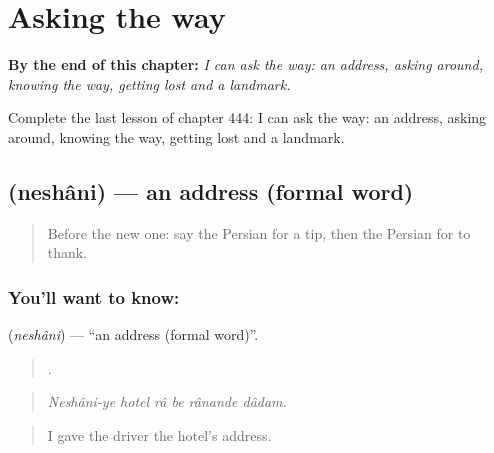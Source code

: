 
\chapter{Asking the way}
\label{ch:fa-asking-the-way}

\begin{chapteropening}
\textbf{By the end of this chapter:} \emph{I can ask the way: an address, asking around, knowing the way, getting lost and a landmark.}

Complete the last lesson of chapter 444: I can ask the way: an address, asking around, knowing the way, getting lost and a landmark.
\end{chapteropening}

\section[\texorpdfstring{\fa{نشانی} (neshâni)}{نشانی (neshâni)}]{ (neshâni) — an address (formal word)}

\label{lesson:FA-C444-neshani}



\begin{quote}
Before the new one: say the Persian for a tip, then the Persian for to thank.
\end{quote}

\subsection*{You'll want to know: }
\textbf{} (\emph{neshâni}) — \textquotedblleft{}an address (formal word)\textquotedblright{}.

\begin{quote}
     .
\end{quote}

\begin{quote}
\emph{Neshâni-ye hotel râ be rânande dâdam.}
\end{quote}

\begin{quote}
I gave the driver the hotel's address.
\end{quote}

